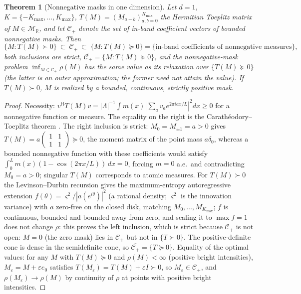 \documentclass[11pt,a4paper]{article}
\newtheorem{theorem}{Theorem}\newtheorem{lemma}[theorem]{Lemma}\newtheorem{proposition}[theorem]{Proposition}
\theoremstyle{remark}\newtheorem*{remark}{Remark}
\newcommand{\R}{\mathbb{R}}\newcommand{\C}{\mathbb{C}}\newcommand{\PSD}{\succeq 0}
\begin{document}
\begin{theorem}[Nonnegative masks in one dimension]\label{thm:toeplitz}
Let $d=1$, $K=\{-K_{\max},\dots,K_{\max}\}$, $T(M)=(M_{a-b})_{a,b=0}^{K_{\max}}$ the Hermitian Toeplitz matrix of $M\in\mathcal M_\R$, and let $\mathcal C_+$ denote the set of in-band coefficient vectors of bounded nonnegative masks. Then
\[\{M:T(M)\succ0\}\ \subset\ \mathcal C_+\ \subset\ \{M:T(M)\PSD\}=\{\text{in-band coefficients of nonnegative measures}\},\]
both inclusions are strict, $\overline{\mathcal C_+}=\{M:T(M)\PSD\}$, and the nonnegative-mask problem $\inf_{M\in\mathcal C_+}\rho(M)$ has the same value as its relaxation over $\{T(M)\PSD\}$ (the latter is an outer approximation; the former need not attain the value). If $T(M)\succ0$, $M$ is realized by a bounded, continuous, strictly positive mask.
\end{theorem}
\begin{proof}
Necessity: $v^{\mathsf H}T(M)v=|\Lambda|^{-1}\int m(x)|\sum_av_ae^{2\pi iax/L}|^2dx\ge0$ for a nonnegative function or measure. The equality on the right is the Carath\'eodory--Toeplitz theorem \cite{grenander1958,dumitrescu2007}. The right inclusion is strict: $M_0=M_{\pm1}=a>0$ gives $T(M)=a\left(\begin{smallmatrix}1&1\\1&1\end{smallmatrix}\right)\PSD$, the moment matrix of the point mass $a\delta_0$, whereas a bounded nonnegative function with these coefficients would satisfy $\int_0^Lm(x)(1-\cos(2\pi x/L))\,dx=0$, forcing $m=0$ a.e.\ and contradicting $M_0=a>0$; singular $T(M)$ corresponds to atomic measures. For $T(M)\succ0$ the Levinson--Durbin recursion gives the maximum-entropy autoregressive extension $f(\theta)=\varsigma^2/|a(e^{i\theta})|^2$ (a rational density; $\varsigma^2$ is the innovation variance) with $a$ zero-free on the closed disk, matching $M_0,\dots,M_{K_{\max}}$; $f$ is continuous, bounded and bounded away from zero, and scaling it to $\max f=1$ does not change $\rho$: this proves the left inclusion, which is strict because $\mathcal C_+$ is not open: $M=0$ (the zero mask) lies in $\mathcal C_+$ but not in $\{T\succ0\}$. The positive-definite cone is dense in the semidefinite cone, so $\overline{\mathcal C_+}=\{T\PSD\}$. Equality of the optimal values: for any $M$ with $T(M)\PSD$ and $\rho(M)<\infty$ (positive bright intensities), $M_\varepsilon=M+\varepsilon e_0$ satisfies $T(M_\varepsilon)=T(M)+\varepsilon I\succ0$, so $M_\varepsilon\in\mathcal C_+$, and $\rho(M_\varepsilon)\to\rho(M)$ by continuity of $\rho$ at points with positive bright intensities.
\end{proof}
\end{document}
